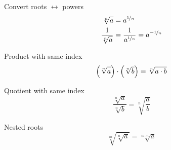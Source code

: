\begin{multicols}{2}

 \begin{FormulaBox}{Convert roots $\longleftrightarrow$ powers}
  \begin{equation*}
   \begin{split}
     \sqrt[n]{a} &= a^{\nicefrac{1}{n}}
     \\
     \frac{1}{\sqrt[n]{a}} &= \frac{1}{a^{\nicefrac{1}{n}}} = a^{-\nicefrac{1}{n}}
     \\
   \end{split}
  \end{equation*}
 \end{FormulaBox}

 \begin{FormulaBox}{Product with same index}
  \begin{equation*}
   \left(\sqrt[n]{\vphantom{b}a}\right)
   \cdot
   \left(\sqrt[n]{b}\right) = \sqrt[n]{a \cdot b}
  \end{equation*}
 \end{FormulaBox}

 \begin{FormulaBox}{Quotient with same index}
  \begin{equation*}
   \frac{\sqrt[n]{a}}{\sqrt[n]{b}}
   =
   \sqrt[n]{\frac{a}{b}}
  \end{equation*}
 \end{FormulaBox}

 \begin{FormulaBox}{Nested roots}
  \begin{equation*}
   \sqrt[m]{\sqrt[n]{a}} = \sqrt[m\cdot n]{a}
  \end{equation*}
 \end{FormulaBox}


\end{multicols}

